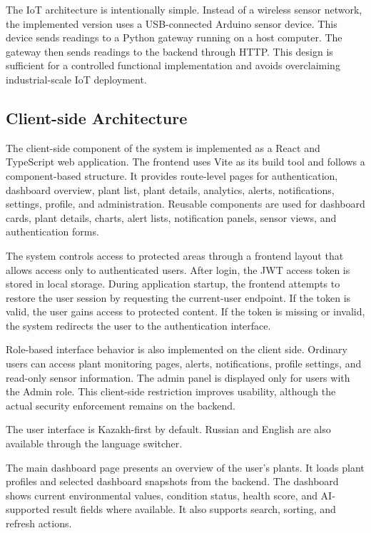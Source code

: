 The IoT architecture is intentionally simple. Instead of a wireless sensor network, the implemented version uses a USB-connected Arduino sensor device. This device sends readings to a Python gateway running on a host computer. The gateway then sends readings to the backend through HTTP. This design is sufficient for a controlled functional implementation and avoids overclaiming industrial-scale IoT deployment.



\subsection{Client-side Architecture}
\label{subsec:client-side-architecture}

The client-side component of the system is implemented as a React and TypeScript web application. The frontend uses Vite as its build tool and follows a component-based structure. It provides route-level pages for authentication, dashboard overview, plant list, plant details, analytics, alerts, notifications, settings, profile, and administration. Reusable components are used for dashboard cards, plant details, charts, alert lists, notification panels, sensor views, and authentication forms.

The system controls access to protected areas through a frontend layout that allows access only to authenticated users. After login, the JWT access token is stored in local storage. During application startup, the frontend attempts to restore the user session by requesting the current-user endpoint. If the token is valid, the user gains access to protected content. If the token is missing or invalid, the system redirects the user to the authentication interface.

Role-based interface behavior is also implemented on the client side. Ordinary users can access plant monitoring pages, alerts, notifications, profile settings, and read-only sensor information. The admin panel is displayed only for users with the Admin role. This client-side restriction improves usability, although the actual security enforcement remains on the backend.

The user interface is Kazakh-first by default. Russian and English are also available through the language switcher.

The main dashboard page presents an overview of the user's plants. It loads plant profiles and selected dashboard snapshots from the backend. The dashboard shows current environmental values, condition status, health score, and AI-supported result fields where available. It also supports search, sorting, and refresh actions.

